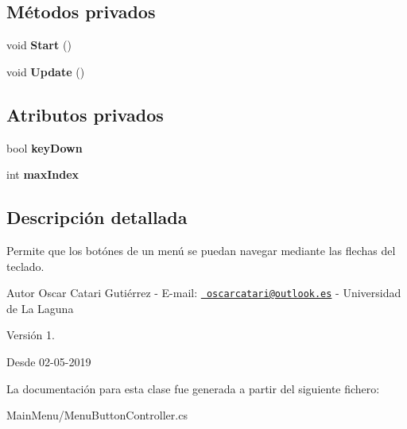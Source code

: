 \subsection*{Métodos privados}
\begin{DoxyCompactItemize}
\item 
\mbox{\label{class_menu_button_controller_a7ae528826025d0ee01078d6bbb6adaeb}} 
void {\bfseries Start} ()
\item 
\mbox{\label{class_menu_button_controller_a4d14bb5d61bc0e2ab0470f8477539640}} 
void {\bfseries Update} ()
\end{DoxyCompactItemize}
\subsection*{Atributos privados}
\begin{DoxyCompactItemize}
\item 
\mbox{\label{class_menu_button_controller_a1eec2959d3af9723da01dc2967bdc7fe}} 
bool {\bfseries key\+Down}
\item 
\mbox{\label{class_menu_button_controller_a78cd4628b0f8d52647f9f81ccad98470}} 
int {\bfseries max\+Index}
\end{DoxyCompactItemize}


\subsection{Descripción detallada}
Permite que los botónes de un menú se puedan navegar mediante las flechas del teclado. \begin{DoxyAuthor}{Autor}
Oscar Catari Gutiérrez -\/ E-\/mail\+: \href{mailto:oscarcatari@outlook.es}{\texttt{ oscarcatari@outlook.\+es}} -\/ Universidad de La Laguna 
\end{DoxyAuthor}
\begin{DoxyVersion}{Versión}
1. 
\end{DoxyVersion}
\begin{DoxySince}{Desde}
02-\/05-\/2019 
\end{DoxySince}


La documentación para esta clase fue generada a partir del siguiente fichero\+:\begin{DoxyCompactItemize}
\item 
Main\+Menu/Menu\+Button\+Controller.\+cs\end{DoxyCompactItemize}
